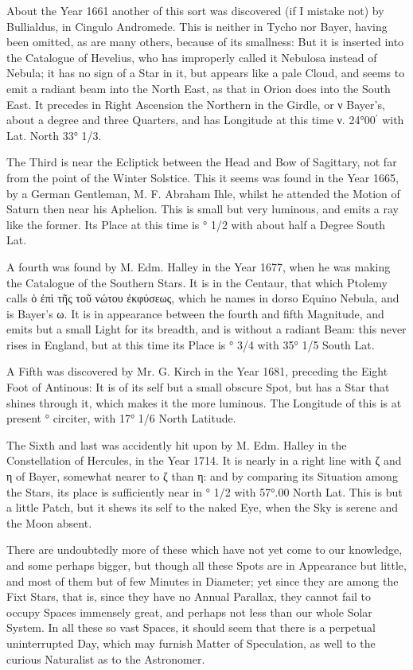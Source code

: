 \documentclass[a4paper, 12pt, oneside, polutonikogreek, english]{article}
\begin{document}
About the Year 1661 another of this sort was discovered (if I mistake not) by Bullialdus, in Cingulo Andromede. This is neither in Tycho nor Bayer, having been omitted, as are many others, because of its smallness: But it is inserted into the Catalogue of Hevelius, who has improperly called it Nebulosa instead of Nebula; it has no sign of a Star in it, but appears like a pale Cloud, and seems to emit a radiant beam into the North East, as that in Orion does into the South East. It precedes in Right Ascension the Northern in the Girdle, or ν Bayer's, about a degree and three Quarters, and has Longitude at this time ν. 24°00$^{\prime}$ with Lat. North 33° 1/3.

The Third is near the Ecliptick between the Head and Bow of Sagittary, not far from the point of the Winter Solstice. This it seems was found in the Year 1665, by a German Gentleman, M. F. Abraham Ihle, whilst he attended the Motion of Saturn then near his Aphelion. This is small but very luminous, and emits a ray like the former. Its Place at this time is ° 1/2 with about half a Degree South Lat.

A fourth was found by M. Edm. Halley in the Year 1677, when he was making the Catalogue of the Southern Stars. It is in the Centaur, that which Ptolemy calls ὁ ἐπὶ τῆς τοῦ νώτου ἐκφύσεως, which he names in dorso Equino Nebula, and is Bayer's ω. It is in appearance between the fourth and fifth Magnitude, and emits but a small Light for its breadth, and is without a radiant Beam: this never rises in England, but at this time its Place is ° 3/4 with 35° 1/5 South Lat.

A Fifth was discovered by Mr. G. Kirch in the Year 1681, preceding the Eight Foot of Antinous: It is of its self but a small obscure Spot, but has a Star that shines through it, which makes it the more luminous. The Longitude of this is at present ° circiter, with 17° 1/6 North Latitude.

The Sixth and last was accidently hit upon by M. Edm. Halley in the Constellation of Hercules, in the Year 1714. It is nearly in a right line with ζ and η of Bayer, somewhat nearer to ζ than η: and by comparing its Situation among the Stars, its place is sufficiently near in ° 1/2 with 57°.00 North Lat. This is but a little Patch, but it shews its self to the naked Eye, when the Sky is serene and the Moon absent.

There are undoubtedly more of these which have not yet come to our knowledge, and some perhaps bigger, but though all these Spots are in Appearance but little, and most of them but of few Minutes in Diameter; yet since they are among the Fixt Stars, that is, since they have no Annual Parallax, they cannot fail to occupy Spaces immensely great, and perhaps not less than our whole Solar System. In all these so vast Spaces, it should seem that there is a perpetual uninterrupted Day, which may furnish Matter of Speculation, as well to the curious Naturalist as to the Astronomer.
\end{document}
